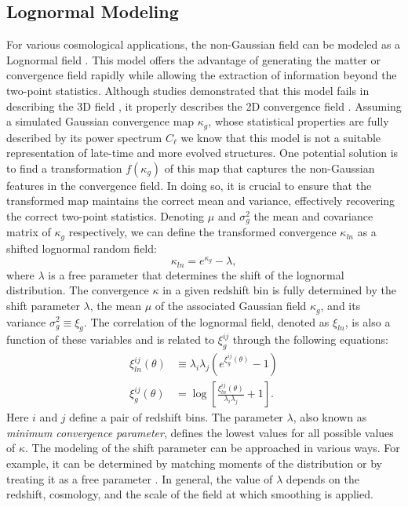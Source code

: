 \documentclass{aa}
\begin{document}
\subsection{Lognormal Modeling}
For various cosmological applications, the non-Gaussian field can be modeled as a Lognormal field \citep{coles1991lognormal,bohm2017bayesian}.
This model offers the advantage of generating the matter or convergence field rapidly while allowing the extraction of information beyond the two-point statistics. 
Although studies demonstrated that this model fails in describing the 3D field \citep{klypin2018density}, it properly describes the 2D convergence field \citep{clerkin2017testing, xavier2016improving}.
Assuming a simulated Gaussian convergence map $\kappa_g$, whose statistical properties are fully described by its power spectrum $C_{\ell}$ we know that this model is not a suitable representation of late-time and more evolved structures. One potential solution is to find a transformation $f(\kappa_g)$ of this map that captures the non-Gaussian features in the convergence field. In doing so, it is crucial to ensure that the transformed map maintains the correct mean and variance, effectively recovering the correct two-point statistics.
Denoting $\mu$ and $\sigma_g^2$ the mean and covariance matrix of $\kappa_g$ respectively, we can define the transformed convergence $\kappa_{ln}$ as a shifted lognormal random field:
\begin{equation}\label{Eq:log_norm_kappa}
    \kappa_{ln}=e^{\kappa_{g}}-\lambda, 
\end{equation}
where $\lambda$ is a free parameter that determines the shift of the lognormal distribution. The convergence $\kappa$ in a given redshift bin is fully determined by the shift parameter $\lambda$, the mean $\mu$ of the associated Gaussian field $\kappa_g$, and its variance $\sigma_{g}^2\equiv \xi_g$.
The correlation of the lognormal field, denoted as $\xi_{ln}$, is also a function of these variables and is related to $\xi^{ij}_g$ through the following equations:
\begin{align}
    \xi^{ij}_{ln}(\theta) & \equiv \lambda_i \lambda_j (e^{ \xi^{ij}_g(\theta)}-1) \nonumber \\ 
    \xi^{ij}_g(\theta)&=\log{\left[ \frac{\xi^{ij}_{ln}(\theta)}{\lambda_i \lambda_j}+1\right ]}. \label{Eq:log_norm_corr}
\end{align}
Here $i$ and $j$ define a pair of redshift bins.
The parameter $\lambda$, also known as \textit{minimum convergence
parameter}, defines the lowest values for all possible values of $\kappa$.
The modeling of the shift parameter can be approached in various ways. For example, it can be determined by matching moments of the distribution \citep{xavier2016improving} or by treating it as a free parameter \citep{hilbert2011cosmic}. In general, the value of $\lambda$ depends on the redshift, cosmology, and the scale of the field at which smoothing is applied.
\end{document}
